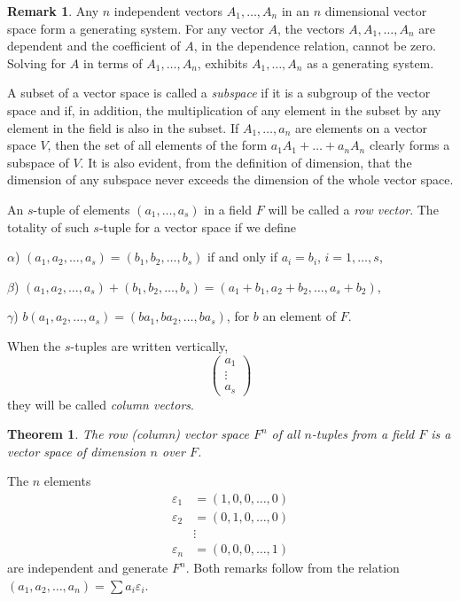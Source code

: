 \documentclass[11pt]{article}
\newtheorem{theo}{Theorem}
\theoremstyle{definition}
\newtheorem*{rema}{Remark}
\def\eps{\varepsilon}
\begin{document}
\begin{rema}
Any $n$ independent vectors $A_1, \ldots, A_n$ in an $n$ dimensional vector space form a generating system.
For any vector $A$, the vectors $A, A_1, \ldots, A_n$ are dependent and the coefficient of $A$, in the dependence relation, cannot be zero.
Solving for $A$ in terms of $A_1, \ldots, A_n$, exhibits $A_1, \ldots, A_n$ as a generating system.
\end{rema}


A subset of a vector space is called a \emph{subspace} if it is a subgroup of the vector space and if, in addition, the multiplication of any element in the subset by any element in the field is also in the subset.
If $A_1, \ldots, a_n$ are elements on a vector space $V$, then the set of all elements of the form $a_1 A_1 + \ldots + a_n A_n$ clearly forms a subspace of $V$.
It is also evident, from the definition of dimension, that the dimension of any subspace never exceeds the dimension of the whole vector space.

An $s$-tuple of elements $(a_1, \ldots, a_s)$ in a field $F$ will be called a \emph{row vector}.
The totality of such $s$-tuple for a vector space if we define

$\alpha$)
$(a_1, a_2, \ldots, a_s) = (b_1, b_2, \ldots, b_s)$ if and only if $a_i = b_i$, $i = 1, \ldots, s$,

$\beta$)
$(a_1, a_2, \ldots, a_s) + (b_1, b_2, \ldots, b_s)
= (a_1 + b_1, a_2 + b_2, \ldots, a_s + b_2)$,

$\gamma$)
$b (a_1, a_2, \ldots, a_s) = (ba_1, ba_2, \ldots, ba_s)$, for $b$ an element of $F$.

When the $s$-tuples are written vertically,
\[
\begin{pmatrix}
a_1 \\ \vdots \\ a_s
\end{pmatrix}
\]
they will be called \emph{column vectors}.


\begin{theo}
\label{theo:th}
The row (column) vector space $F^n$ of all $n$-tuples from a field $F$ is a vector space of dimension $n$ over $F$.
\end{theo}

The $n$ elements
\begin{align*}
\eps_1 &= (1, 0, 0, \ldots, 0)
\\
\eps_2 &= (0, 1, 0, \ldots, 0)
\\
       & \vdots 
\\
\eps_n &= (0, 0, 0, \ldots, 1)
\end{align*}
are independent and generate $F^n$.
Both remarks follow from the relation $(a_1, a_2, \ldots, a_n) = \sum a_i \eps_i$.
\end{document}
